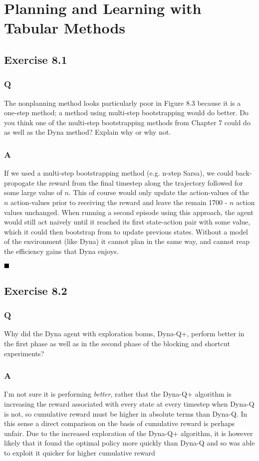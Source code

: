 \section{Planning and Learning with Tabular Methods}
\subsection{Exercise 8.1}
\subsubsection{Q}
The nonplanning method looks particularly poor in Figure 8.3 because it is a one-step method; a method using multi-step bootstrapping would do better. Do you think one of the multi-step bootstrapping methods from Chapter 7 could do as well as the Dyna method? Explain why or why not.
\subsubsection{A}
If we used a multi-step bootstrapping method (e.g. n-step Sarsa), we could back-propogate the reward from the final timestep along the trajectory followed for some large value of $n$. This of course would only update the action-values of the $n$ action-values prior to receiving the reward and leave the remain 1700 - $n$ action values unchanged. When running a second episode using this approach, the agent would still act naively until it reached its first state-action pair with some value, which it could then bootstrap from to update previous states. Without a model of the environment (like Dyna) it cannot plan in the same way, and cannot reap the efficiency gains that Dyna enjoys. 

$
\hfill \blacksquare
$

\subsection{Exercise 8.2}
\subsubsection{Q}
Why did the Dyna agent with exploration bonus, Dyna-Q+, perform better in the first phase as well as in the second phase of the blocking and shortcut experiments?
\subsubsection{A}
I'm not sure it is performing \textit{better}, rather that the Dyna-Q+ algorithm is increasing the reward associated with every state at every timestep when Dyna-Q is not, so cumulative reward must be higher in absolute terms than Dyna-Q. In this sense a direct comparison on the basis of cumulative reward is perhaps unfair. Due to the increased exploration of the Dyna-Q+ algorithm, it is however likely that it found the optimal policy more quickly than Dyna-Q and so was able to exploit it quicker for higher cumulative reward

